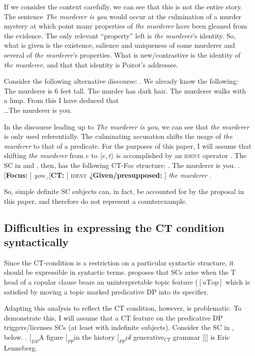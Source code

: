 \documentclass[GPFinal]{subfiles}
\begin{document}
If we consider the context carefully, we can see that this is not the entire story.
The sentence \textit{The murderer is you} would occur at the culmination of a murder mystery at which point many properties of \textit{the murderer} have been gleaned from the evidence.
The only relevant ``property'' left is \textit{the murderer}'s identity.
So, what is given is the existence, salience and uniqueness of  some murderer and several of \textit{the murderer}'s properties.
What is new/contrastive is the identity of \textit{the murderer}, and that that identity is Poirot's addressee.

Consider the following alternative discourse:
\ex. We already know the following: The murderer is 6 feet tall. The murder has dark hair. The murderer walks with a limp. From this I have deduced that \\
\ldots The murderer is you.

In the discourse leading up to \textit{The murderer is you}, we can see that \textit{the murderer} is only used referentially.
The culminating accusation shifts the usage of \textit{the murderer} to that of a predicate.
For the purposes of this paper, I will assume that shifting \textit{the murderer} from $e$ to $\langle e, t\rangle$ is accomplished by an \textsc{ident} operator \parencite[cf.][]{partee1987noun}.
The SC in \Last and \LLast, then, has the following CT-Foc structure:
\ex. The murderer is you.
\a.[\textbf{Focus: }] \textit{you}
\b.[\textbf{CT: }] \textsc{ident}
\c.[\textbf{Given/presupposed:} ] \textit{the murderer}
\z.

So, simple definite SC subjects can, in fact, be accounted for by the proposal in this paper, and therefore do not represent a counterexample.
\subsection{Difficulties in expressing the CT condition syntactically}
Since the CT-condition is a restriction on a particular syntactic structure, it should be expressible in syntactic terms.
\textcite{mikkelsen2004specifying} proposes that SCs arise when the T head of a copular clause bears an uninterpretable topic feature ($[u\text{Top}]$ which is satisfied by moving a topic marked predicative DP into its specifier.

Adapting this analysis to reflect the CT condition, however, is problematic.
To demonstrate this, I will assume that a CT feature on the predicative DP triggers/licenses SCs (at least with indefinite subjects).
Consider the SC in \Next, below.
\ex. $[_{DP}$A figure $[_{PP}$in the history $[_{PP}$of generative$_{CT}$ grammar $]]]$ is Eric Lenneberg.
\end{document}
